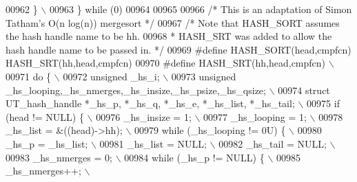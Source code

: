 \begin{DoxyCode}
{{{{{{{{{00962 \textcolor{preprocessor}{  \}                                                                              \(\backslash\)}
00963 \textcolor{preprocessor}{\} while (0)}
00964 
00965 
00966 \textcolor{comment}{/* This is an adaptation of Simon Tatham's O(n log(n)) mergesort */}
00967 \textcolor{comment}{/* Note that HASH\_SORT assumes the hash handle name to be hh.}
00968 \textcolor{comment}{ * HASH\_SRT was added to allow the hash handle name to be passed in. */}
00969 \textcolor{preprocessor}{#define HASH\_SORT(head,cmpfcn) HASH\_SRT(hh,head,cmpfcn)}
00970 \textcolor{preprocessor}{#define HASH\_SRT(hh,head,cmpfcn)                                                 \(\backslash\)}
00971 \textcolor{preprocessor}{do \{                                                                             \(\backslash\)}
00972 \textcolor{preprocessor}{  unsigned \_hs\_i;                                                                \(\backslash\)}
00973 \textcolor{preprocessor}{  unsigned \_hs\_looping,\_hs\_nmerges,\_hs\_insize,\_hs\_psize,\_hs\_qsize;               \(\backslash\)}
00974 \textcolor{preprocessor}{  struct UT\_hash\_handle *\_hs\_p, *\_hs\_q, *\_hs\_e, *\_hs\_list, *\_hs\_tail;            \(\backslash\)}
00975 \textcolor{preprocessor}{  if (head != NULL) \{                                                            \(\backslash\)}
00976 \textcolor{preprocessor}{    \_hs\_insize = 1;                                                              \(\backslash\)}
00977 \textcolor{preprocessor}{    \_hs\_looping = 1;                                                             \(\backslash\)}
00978 \textcolor{preprocessor}{    \_hs\_list = &((head)->hh);                                                    \(\backslash\)}
00979 \textcolor{preprocessor}{    while (\_hs\_looping != 0U) \{                                                  \(\backslash\)}
00980 \textcolor{preprocessor}{      \_hs\_p = \_hs\_list;                                                          \(\backslash\)}
00981 \textcolor{preprocessor}{      \_hs\_list = NULL;                                                           \(\backslash\)}
00982 \textcolor{preprocessor}{      \_hs\_tail = NULL;                                                           \(\backslash\)}
00983 \textcolor{preprocessor}{      \_hs\_nmerges = 0;                                                           \(\backslash\)}
00984 \textcolor{preprocessor}{      while (\_hs\_p != NULL) \{                                                    \(\backslash\)}
00985 \textcolor{preprocessor}{        \_hs\_nmerges++;                                                           \(\backslash\)}
}}}}}}}}}
\end{DoxyCode}
